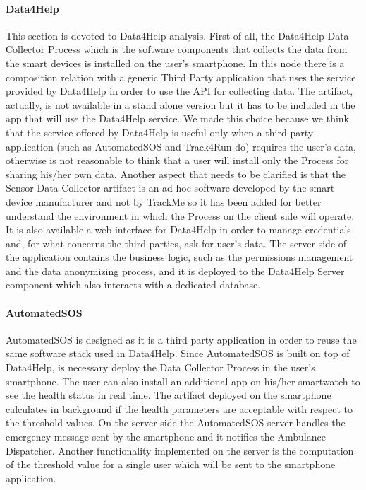 \documentclass[a4paper]{article}
\begin{document}
\paragraph{Data4Help}
This section is devoted to Data4Help analysis. First of all, the Data4Help Data Collector Process which is the software components that collects the data from the smart devices is installed on the user's smartphone. In this node there is a composition relation with a generic Third Party application that uses the service provided by Data4Help in order to use the API for collecting data. The artifact, actually, is not available in a stand alone version but it has to be included in the app that will use the Data4Help service. We made this choice because we think that the service offered by Data4Help is useful only when a third party application (such as AutomatedSOS and Track4Run do) requires the user's data, otherwise is not reasonable to think that a user will install only the Process for sharing his/her own data.
Another aspect that needs to be clarified is that the Sensor Data Collector artifact is an ad-hoc software developed by the smart device manufacturer and not by TrackMe so it has been added for better understand the environment in which the Process on the client side will operate.
It is also available a web interface for Data4Help in order to manage credentials and, for what concerns the third parties, ask for user's data.
The server side of the application contains the business logic, such as the permissions management and the data anonymizing process, and it is deployed to the Data4Help Server component which also interacts with a dedicated database.

\paragraph{AutomatedSOS}
AutomatedSOS is designed as it is a third party application in order to reuse the same software stack used in Data4Help. Since AutomatedSOS is built on top of Data4Help, is necessary deploy the Data Collector Process in the user's smartphone. The user can also install an additional app on his/her smartwatch to see the health status in real time. The artifact deployed on the smartphone calculates in background if the health parameters are acceptable with respect to the threshold values. On the server side the AutomatedSOS server handles the emergency message sent by the smartphone and it notifies the Ambulance Dispatcher. Another functionality implemented on the server is the computation of the threshold value for a single user which will be sent to the smartphone application.
\end{document}

